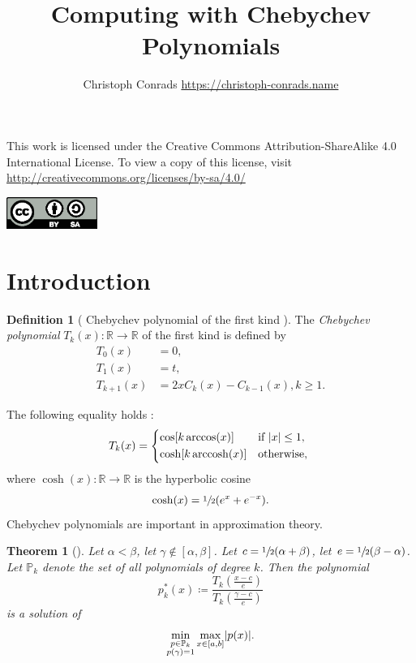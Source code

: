 \documentclass[%
	paper=a4,
	fontsize=10pt,
	DIV11,BCOR10mm,
	numbers=noenddot,
	abstract=yes
]{scrartcl}
\title{Computing with Chebychev Polynomials}
\author{Christoph Conrads {\small \url{https://christoph-conrads.name}}}
\newcommand{\R}{\mathbb{R}}
\DeclarePairedDelimiter\abs{\lvert}{\rvert}
\newtheorem{theorem}{Theorem}[section]
\theoremstyle{definition}
\newtheorem{definition}{Definition}[section]
\begin{document}
\maketitle

\begin{center}
	\begin{minipage}{0.8\textwidth}
		This work is licensed under the Creative Commons Attribution-ShareAlike
		4.0 International License. To view a copy of this license, visit \\
		\url{http://creativecommons.org/licenses/by-sa/4.0/}
	\end{minipage}

	\vspace{1\baselineskip}

	\includegraphics[width=8em]{creative-commons-by-sa}
\end{center}



\section{Introduction}

\begin{definition}[%
	{Chebychev polynomial of the first kind \cite[§4.4]{Saad2011}}]
	The \emph{Chebychev polynomial} $T_k(x): \R \rightarrow \R$ of the first
	kind is defined by
	\begin{align*}
		T_0(x) &= 0, \\
		T_1(x) &= t, \\
		T_{k+1}(x) &= 2x C_k(x) - C_{k-1}(x), k \geq 1.
	\end{align*}
\end{definition}

The following equality holds \cite[§4.4.1]{Saad2011}:
\[
	T_k(x) =
	\begin{dcases*}
		\cos[k \arccos(x)] & if $\abs{x} \leq 1$, \\
		\cosh[k \operatorname{arccosh}(x)] & otherwise,
	\end{dcases*}
\]
where $\cosh(x): \R \rightarrow \R$ is the hyperbolic cosine
\cite[§13.6]{Kreyszig2011}
\[ \cosh(x) = \sfrac{1}{2} (e^x + e^{-x}). \]
Chebychev polynomials are important in approximation theory.

\begin{theorem}[{\cite[Theorem~4.8]{Saad2011}}]
	Let $\alpha < \beta$, let $\gamma \not\in [\alpha, \beta]$. Let $c =
	\sfrac{1}{2} (\alpha + \beta)$, let $e = \sfrac{1}{2}(\beta - \alpha)$. Let
	$\mathbb{P}_k$ denote the set of all polynomials of degree $k$. Then the
	polynomial
	\[
		p_k^*(x) \coloneqq \frac%
			{T_k \left(\frac{x-c}{e}\right)}
			{T_k \left(\frac{\gamma-c}{e}\right)}
	\]
	is a solution of
	\[
		\min_{\substack{p \in \mathbb{P}_k \\ p(\gamma) = 1}}
		\max_{x \in [a,b]} \abs{p(x)}.
	\]
\end{theorem}
\end{document}
